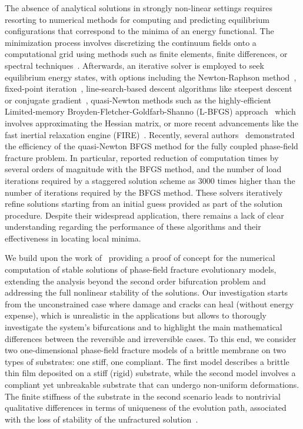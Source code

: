 \documentclass[10pt]{article}
\begin{document}
The absence of analytical solutions in strongly non-linear settings requires resorting to numerical methods for computing and predicting equilibrium configurations that correspond to the minima of an energy functional. The minimization process involves discretizing the continuum fields onto a computational grid using methods such as finite elements, finite differences, or spectral techniques~\cite{Salman2009-qv,Liu2013-sj,Hu2021-mq}. Afterwards, an iterative solver is employed to seek equilibrium energy states, with options including the Newton-Raphson method~\cite{Wick2017-bo}, fixed-point iteration~\cite{Chen2019-mn,Kirkesaether_Brun2020-wa,Storvik2021-cd}, line-search-based descent algorithms like steepest descent or conjugate gradient~\cite{Stiefel1952-fw,Dai1999-hz}, quasi-Newton methods such as the highly-efficient Limited-memory Broyden-Fletcher-Goldfarb-Shanno (\textsc{L-BFGS}) approach~\cite{Liu1989-kl} which involves approximating the Hessian matrix, or more recent advancements like the fast inertial relaxation engine (\textsc{FIRE})~\cite{Guenole2020-tc}.
{
Recently, several authors~\cite{bharali:2022, najmeddine:2024, wu:2020} demonstrated the efficiency of the quasi-Newton BFGS
method for the fully coupled phase-field fracture problem. In particular, \cite{najmeddine:2024} reported reduction of computation
times by several orders of magnitude with the BFGS method, and the number of load iterations required by a staggered solution scheme as 3000 times higher than the number of iterations required by the BFGS method.
}
These solvers iteratively refine solutions starting from an initial guess provided as part of the solution procedure. Despite their widespread application, there remains a lack of clear understanding regarding the performance of these algorithms and their effectiveness in locating local minima.



    {We build upon the work of~\cite{Baldelli2021-gc}
        providing a proof of concept for the numerical computation of stable solutions of phase-field fracture evolutionary models, extending the analysis beyond the second order bifurcation problem and addressing the full nonlinear stability of the solutions.
        Our investigation starts from the unconstrained case where damage and cracks can heal (without energy expense), which is unrealistic in the applications but allows to thorougly investigate the system's bifurcations and to highlight the main mathematical differences between the reversible and irreversible cases.
        To this end,
    }
%
we consider two one-dimensional phase-field fracture models of a brittle membrane on two types of substrates: one stiff, one compliant. The first model describes a brittle thin film deposited on a stiff (rigid) substrate, while the second model involves a compliant yet unbreakable substrate that can undergo non-uniform deformations. The finite stiffness of the substrate in the second scenario leads to nontrivial qualitative differences in terms of uniqueness of the evolution path, associated with  the loss of stability of the unfractured solution~\cite{Baldelli2014-ho,Kuhn2015-rt,Baldelli2021-gc,Harandi2023-cd,zolesi:2024}.
\end{document}
